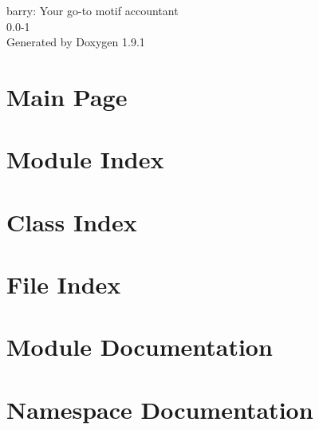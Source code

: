 \let\mypdfximage\pdfximage\def\pdfximage{\immediate\mypdfximage}\documentclass[twoside]{book}
\newcommand{\+}{\discretionary{\mbox{\scriptsize$\hookleftarrow$}}{}{}}
\newcommand{\clearemptydoublepage}{%
  \newpage{\pagestyle{empty}\cleardoublepage}%
}
\begin{document}
\raggedbottom

\hypersetup{pageanchor=false,
             bookmarksnumbered=true,
             pdfencoding=unicode
            }
\begin{titlepage}
\vspace*{7cm}
\begin{center}%
{\Large barry\+: Your go-\/to motif accountant \\[1ex]\large 0.\+0-\/1 }\\
\vspace*{1cm}
{\large Generated by Doxygen 1.9.1}\\
\end{center}
\end{titlepage}
\clearemptydoublepage
{}
\tableofcontents
\clearemptydoublepage
{}
\hypersetup{pageanchor=true}

\chapter{Main Page}
\label{index}\hypertarget{index}{}
\chapter{Module Index}

\chapter{Class Index}

\chapter{File Index}

\chapter{Module Documentation}





\chapter{Namespace Documentation}






\end{document}
